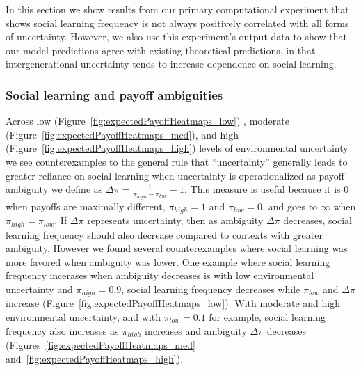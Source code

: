 \documentclass[10pt,letterpaper]{article}
\begin{document}
In this section we show results from our primary computational experiment that
shows social learning frequency is not always positively correlated with 
all forms of uncertainty. However, we also use this experiment's output data
to show that our model predictions agree
with existing theoretical predictions, in that intergenerational uncertainty 
tends to increase dependence on social learning.


\subsubsection{Social learning and payoff ambiguities}

Across low (Figure~\ref{fig:expectedPayoffHeatmaps_low}) , moderate
(Figure~\ref{fig:expectedPayoffHeatmaps_med}), and high
(Figure~\ref{fig:expectedPayoffHeatmaps_high}) levels of environmental
uncertainty we see counterexamples to the general rule that ``uncertainty''
generally leads to greater reliance on social learning when uncertainty is
operationalized as payoff ambiguity we define as 
$\Delta \pi = \frac{1}{\pi_{high} - \pi_{low}}
- 1$. This measure is useful because it is 0 when payoffs are maximally 
different, $\pi_{high} = 1$ and $\pi_{low} = 0$, and goes to $\infty$ when
$\pi_{high} = \pi_{low}$. If $\Delta \pi$ represents uncertainty, then as 
ambiguity $\Delta \pi$ decreases, social learning frequency should also decrease 
compared to contexts with greater ambiguity. However we found several counterexamples
where social learning was more favored when ambiguity was lower.
One example where social learning frequency incerases when ambiguity decreases
is with low environmental uncertainty and $\pi_{high} = 0.9$,
social learning frequency decreases while $\pi_{low}$ and $\Delta \pi$ 
increase (Figure~\ref{fig:expectedPayoffHeatmaps_low}).
With moderate and high environmental uncertainty, and with $\pi_{low} = 0.1$
for example, social learning frequency also increases as $\pi_{high}$ increases
and ambiguity $\Delta \pi$ decreases (Figures~\ref{fig:expectedPayoffHeatmaps_med}
and~\ref{fig:expectedPayoffHeatmaps_high}). 
\end{document}
